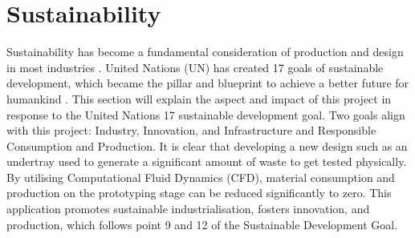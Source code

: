 \section{Sustainability}

\noindent Sustainability has become a fundamental consideration of production and design in most industries \cite{Gates2021HowDisaster}. United Nations (UN) has created 17 goals of sustainable development, which became the pillar and blueprint to achieve a better future for humankind \cite{THEDevelopmentb}. This section will explain the aspect and impact of this project in response to the United Nations 17 sustainable development goal. Two goals align with this project: Industry, Innovation, and Infrastructure and Responsible Consumption and Production. It is clear that developing a new design such as an undertray used to generate a significant amount of waste to get tested physically. By utilising Computational Fluid Dynamics (CFD), material consumption and production on the prototyping stage can be reduced significantly to zero. This application promotes sustainable industrialisation, fosters innovation, and production, which follows point 9 and 12 of the Sustainable Development Goal.

